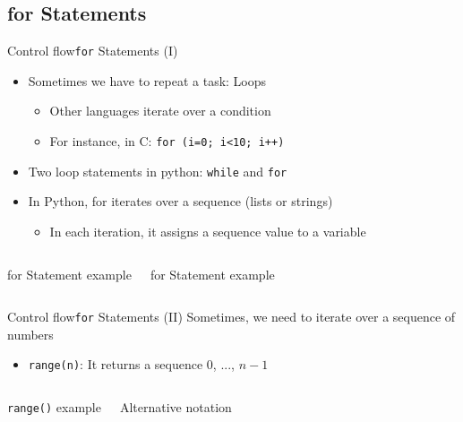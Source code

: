 \documentclass[10pt,compress]{beamer} %
\begin{document}
\subsection{for Statements}
\begin{frame}{Control flow}{\texttt{for} Statements (I)}
	\begin{itemize}
		\item Sometimes we have to repeat a task: Loops
			\begin{itemize}
			\item Other languages iterate over a condition
			\item For instance, in C: \texttt{for (i=0; i<10; i++)}
			\end{itemize}
		\item Two loop statements in python: \texttt{while} and \texttt{for}
		\item In Python, for iterates over a sequence (lists or strings)
			\begin{itemize}
			\item In each iteration, it assigns a sequence value to a variable
			\end{itemize}
	\end{itemize}

    \begin{columns}
		\begin{block}{for Statement example}
		
		\end{block}


		\begin{block}{for Statement example}
		
		\end{block}
	\end{columns}
\end{frame}

\begin{frame}{Control flow}{\texttt{for} Statements (II)}
	Sometimes, we need to iterate over a sequence of numbers
	\begin{itemize}
		\item \texttt{range(n)}: It returns a sequence $0$, ..., $n-1$
	\end{itemize}

    \begin{columns}
		\begin{block}{\texttt{range()} example}
		
		\end{block}
		
		\begin{block}{Alternative notation}
		
		\end{block}
	\end{columns}
\end{frame}
\end{document}
